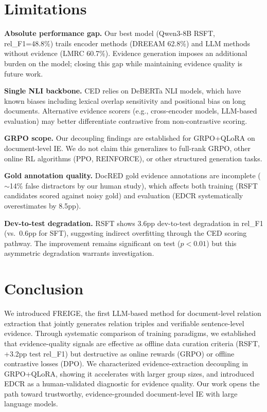 \documentclass[11pt]{article}
\newcommand{\method}{FREIGE}
\begin{document}
\section{Limitations}

\textbf{Absolute performance gap.} Our best model (Qwen3-8B RSFT, rel\_F1=48.8\%) trails encoder methods (DREEAM 62.8\%) and LLM methods without evidence (LMRC 60.7\%).
Evidence generation imposes an additional burden on the model; closing this gap while maintaining evidence quality is future work.

\textbf{Single NLI backbone.} CED relies on DeBERTa NLI models, which have known biases including lexical overlap sensitivity and positional bias on long documents.
Alternative evidence scorers (e.g., cross-encoder models, LLM-based evaluation) may better differentiate contrastive from non-contrastive scoring.

\textbf{GRPO scope.} Our decoupling findings are established for GRPO+QLoRA on document-level IE.
We do not claim this generalizes to full-rank GRPO, other online RL algorithms (PPO, REINFORCE), or other structured generation tasks.

\textbf{Gold annotation quality.} DocRED gold evidence annotations are incomplete (${\sim}$14\% false distractors by our human study), which affects both training (RSFT candidates scored against noisy gold) and evaluation (EDCR systematically overestimates by 8.5pp).

\textbf{Dev-to-test degradation.} RSFT shows 3.6pp dev-to-test degradation in rel\_F1 (vs.\ 0.6pp for SFT), suggesting indirect overfitting through the CED scoring pathway.
The improvement remains significant on test ($p{<}0.01$) but this asymmetric degradation warrants investigation.

\section{Conclusion}

We introduced \method{}, the first LLM-based method for document-level relation extraction that jointly generates relation triples and verifiable sentence-level evidence.
Through systematic comparison of training paradigms, we established that evidence-quality signals are effective as offline data curation criteria (RSFT, +3.2pp test rel\_F1) but destructive as online rewards (GRPO) or offline contrastive losses (DPO).
We characterized evidence-extraction decoupling in GRPO+QLoRA, showing it accelerates with larger group sizes, and introduced EDCR as a human-validated diagnostic for evidence quality.
Our work opens the path toward trustworthy, evidence-grounded document-level IE with large language models.
\end{document}
